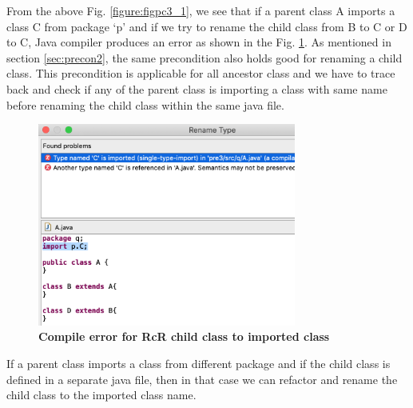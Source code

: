 From the above Fig. \ref{figure:figpc3_1}, we see that if a parent class A imports a class C from package `p' and if we try to rename the child class from B to C or D to C, Java compiler produces an error as shown in the Fig. \ref{figure:figpc3_2}. As mentioned in  section \ref{sec:precon2}, the same precondition also holds good for renaming a child class. This precondition is applicable for all ancestor class and we have to trace back and check if any of the parent class is importing a class with same name before renaming the child class within the same java file.
\begin{figure}[htbp]
\centerline{\includegraphics[width=85mm,scale=0.5]{precond3.png}}
\caption{\textbf{Compile error for RcR child class to imported class}}
\label{figure:figpc3_2}
\end{figure}

If a parent class imports a class from different package and if the child class is defined in a separate java file, then in that case we can refactor and rename the child class to the imported class name.
